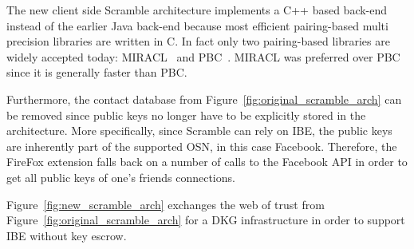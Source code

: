 The new client side Scramble architecture implements a C++ based back-end instead of the earlier Java back-end because most efficient pairing-based multi precision libraries are written in C. In fact only two pairing-based libraries are widely accepted today: MIRACL~\cite{art:Scott03} and PBC~\cite{thesis:Lynn07}. MIRACL was preferred over PBC since it is generally faster than PBC. 

Furthermore, the contact database from Figure~\ref{fig:original_scramble_arch} can be removed since public keys no longer have to be explicitly stored in the architecture. More specifically, since Scramble can rely on IBE, the public keys are inherently part of the supported OSN, in this case Facebook. Therefore, the FireFox extension falls back on a number of calls to the Facebook API in order to get all public keys of one's friends connections.

Figure~\ref{fig:new_scramble_arch} exchanges the web of trust from Figure~\ref{fig:original_scramble_arch} for a DKG infrastructure in order to support IBE without key escrow.



